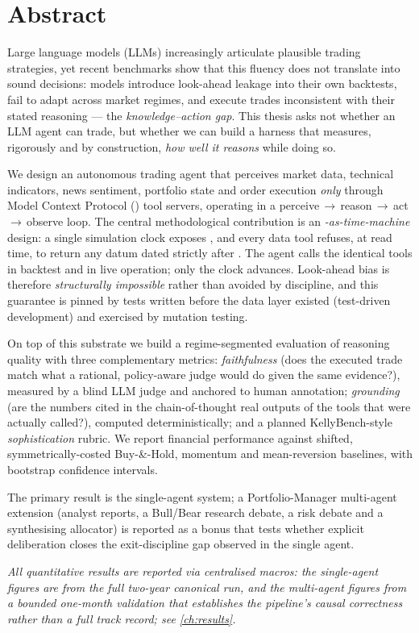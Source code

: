 \chapter*{Abstract}

Large language models (LLMs) increasingly articulate plausible trading strategies, yet
recent benchmarks show that this fluency does not translate into sound decisions: models
introduce look-ahead leakage into their own backtests, fail to adapt across market
regimes, and execute trades inconsistent with their stated reasoning --- the
\emph{knowledge--action gap}. This thesis asks not whether an LLM agent can trade, but
whether we can build a harness that measures, rigorously and by construction, \emph{how
well it reasons} while doing so.

We design an autonomous trading agent that perceives market data, technical indicators,
news sentiment, portfolio state and order execution \emph{only} through Model Context
Protocol (\mcp) tool servers, operating in a \mbox{perceive\,$\rightarrow$\,reason\,$\rightarrow$\,act\,$\rightarrow$\,observe}
loop. The central methodological contribution is an \emph{\mcp-as-time-machine} design: a
single simulation clock exposes \tnow, and every data tool refuses, at read time, to
return any datum dated strictly after \tnow. The agent calls the identical tools in
backtest and in live operation; only the clock advances. Look-ahead bias is therefore
\emph{structurally impossible} rather than avoided by discipline, and this guarantee is
pinned by tests written before the data layer existed (test-driven development) and
exercised by mutation testing.

On top of this substrate we build a regime-segmented evaluation of reasoning quality with
three complementary metrics: \emph{faithfulness} (does the executed trade match what a
rational, policy-aware judge would do given the same evidence?), measured by a blind
LLM judge and anchored to human annotation; \emph{grounding} (are the numbers cited in the
chain-of-thought real outputs of the tools that were actually called?), computed
deterministically; and a planned KellyBench-style \emph{sophistication} rubric. We report
financial performance against shifted, symmetrically-costed Buy-\&-Hold, momentum and
mean-reversion baselines, with bootstrap confidence intervals.

The primary result is the single-agent system; a Portfolio-Manager multi-agent extension
(analyst reports, a Bull/Bear research debate, a risk debate and a synthesising allocator)
is reported as a bonus that tests whether explicit deliberation closes the
exit-discipline gap observed in the single agent.

\bigskip
\noindent\textit{All quantitative results are reported via centralised macros: the
single-agent figures are from the full two-year canonical run, and the multi-agent figures
from a bounded one-month validation that establishes the pipeline's causal correctness rather
than a full track record; see \cref{ch:results}.}

